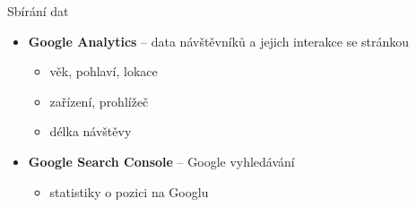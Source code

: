 \documentclass[14pt, hyperref={unicode}]{beamer}
\begin{document}
    \begin{frame}{Sbírání dat}
      \pause
      \begin{itemize}[<+->]
        \item \textbf{Google Analytics} -- data návštěvníků a jejich interakce se stránkou
        \begin{itemize}
          \item věk, pohlaví, lokace
          \item zařízení, prohlížeč
          \item délka návštěvy
        \end{itemize}
      \end{itemize}

      \begin{itemize}[<+->]
        \item \textbf{Google Search Console} -- Google vyhledávání
        \begin{itemize}
          \item statistiky o pozici na Googlu
        \end{itemize}
      \end{itemize}
    \end{frame}
\end{document}
